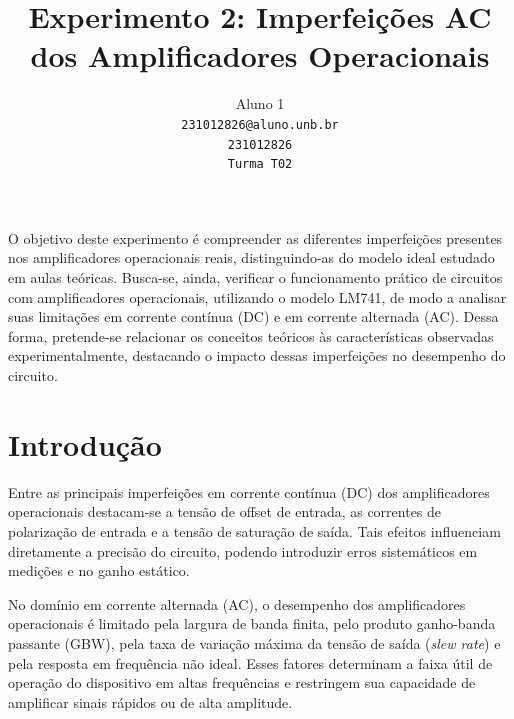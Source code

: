\documentclass[10pt,twocolumn,letterpaper]{article}
\begin{document}
\title{Experimento 2: Imperfeições AC dos Amplificadores Operacionais}

\author{Aluno 1\\
{\tt\small 231012826@aluno.unb.br}\\
{\tt\small 231012826}\\
{\tt\small Turma T02}
}

\maketitle


\begin{objetivo}
O objetivo deste experimento é compreender as diferentes imperfeições presentes nos amplificadores operacionais reais, distinguindo-as do modelo ideal estudado em aulas teóricas. Busca-se, ainda, verificar o funcionamento prático de circuitos com amplificadores operacionais, utilizando o modelo LM741, de modo a analisar suas limitações em corrente contínua (DC) e em corrente alternada (AC). Dessa forma, pretende-se relacionar os conceitos teóricos às características observadas experimentalmente, destacando o impacto dessas imperfeições no desempenho do circuito.


\end{objetivo}

\section{Introdução}

Entre as principais imperfeições em corrente contínua (DC) dos amplificadores operacionais destacam-se a tensão de offset de entrada, as correntes de polarização de entrada e a tensão de saturação de saída. Tais efeitos influenciam diretamente a precisão do circuito, podendo introduzir erros sistemáticos em medições e no ganho estático.

No domínio em corrente alternada (AC), o desempenho dos amplificadores operacionais é limitado pela largura de banda finita, pelo produto ganho-banda passante (GBW), pela taxa de variação máxima da tensão de saída (\textit{slew rate}) e pela resposta em frequência não ideal. Esses fatores determinam a faixa útil de operação do dispositivo em altas frequências e restringem sua capacidade de amplificar sinais rápidos ou de alta amplitude.
\end{document}
